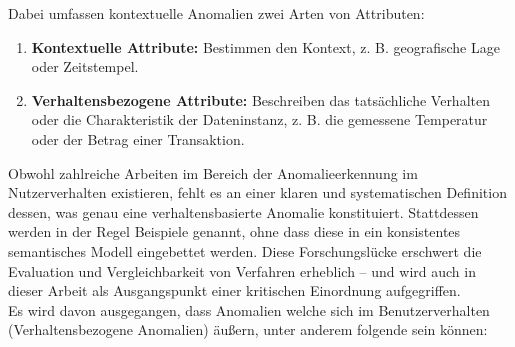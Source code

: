 \documentclass[a4paper,12pt]{article}
\begin{document}
	Dabei umfassen kontextuelle Anomalien zwei Arten von Attributen:
	
	\begin{enumerate}
		\item \textbf{Kontextuelle Attribute:} Bestimmen den Kontext, z. B. geografische Lage oder Zeitstempel.
		\item \textbf{Verhaltensbezogene Attribute:} Beschreiben das tatsächliche Verhalten oder die Charakteristik der Dateninstanz, z. B. die gemessene Temperatur oder der Betrag einer Transaktion.
	\end{enumerate}
	Obwohl zahlreiche Arbeiten im Bereich der Anomalieerkennung im Nutzerverhalten existieren, fehlt es an einer klaren und systematischen Definition dessen, was genau eine verhaltensbasierte Anomalie konstituiert. Stattdessen werden in der Regel Beispiele genannt, ohne dass diese in ein konsistentes semantisches Modell eingebettet werden. Diese Forschungslücke erschwert die Evaluation und Vergleichbarkeit von Verfahren erheblich – und wird auch in dieser Arbeit als Ausgangspunkt einer kritischen Einordnung aufgegriffen.
	\\[0.5em]
	Es wird davon ausgegangen, dass Anomalien welche sich im Benutzerverhalten (Verhaltensbezogene Anomalien) äußern, unter anderem folgende sein können:
	
\end{document}
